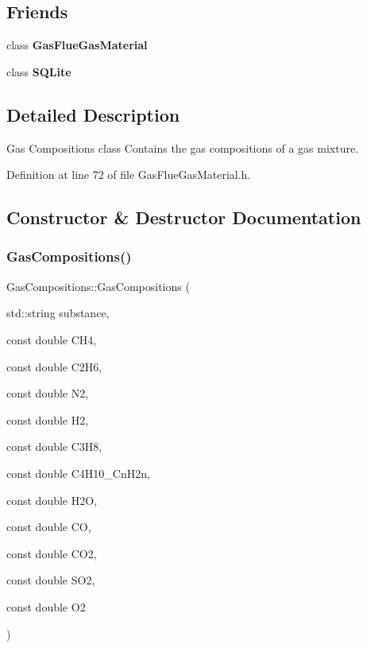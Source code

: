 \subsection*{Friends}
\begin{DoxyCompactItemize}
\item 
\mbox{\label{class_gas_compositions_a766940ed13969e69611945f2d080c881}} 
class {\bfseries Gas\+Flue\+Gas\+Material}
\item 
\mbox{\label{class_gas_compositions_ac7d22f3ca36435f73d55df60dc799e14}} 
class {\bfseries S\+Q\+Lite}
\end{DoxyCompactItemize}


\subsection{Detailed Description}
Gas Compositions class Contains the gas compositions of a gas mixture. 

Definition at line 72 of file Gas\+Flue\+Gas\+Material.\+h.



\subsection{Constructor \& Destructor Documentation}
\mbox{\label{class_gas_compositions_ad0021d4285883374f8904f9465e41920}} 
\subsubsection{\texorpdfstring{Gas\+Compositions()}{GasCompositions()}}
{\footnotesize\ttfamily Gas\+Compositions\+::\+Gas\+Compositions (\begin{DoxyParamCaption}\item[{std\+::string}]{substance,  }\item[{const double}]{C\+H4,  }\item[{const double}]{C2\+H6,  }\item[{const double}]{N2,  }\item[{const double}]{H2,  }\item[{const double}]{C3\+H8,  }\item[{const double}]{C4\+H10\+\_\+\+Cn\+H2n,  }\item[{const double}]{H2O,  }\item[{const double}]{CO,  }\item[{const double}]{C\+O2,  }\item[{const double}]{S\+O2,  }\item[{const double}]{O2 }\end{DoxyParamCaption})\hspace{0.3cm}{\ttfamily [inline]}}

